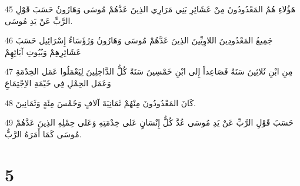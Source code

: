 \par 45 هَؤُلاءِ هُمُ المَعْدُودُونَ مِنْ عَشَائِرِ بَنِي مَرَارِي الذِينَ عَدَّهُمْ مُوسَى وَهَارُونُ حَسَبَ قَوْلِ الرَّبِّ عَنْ يَدِ مُوسَى.
\par 46 جَمِيعُ المَعْدُودِينَ اللاوِيِّينَ الذِينَ عَدَّهُمْ مُوسَى وَهَارُونُ وَرُؤَسَاءُ إِسْرَائِيل حَسَبَ عَشَائِرِهِمْ وَبُيُوتِ آبَائِهِمْ
\par 47 مِنِ ابْنِ ثَلاثِينَ سَنَةً فَصَاعِداً إِلى ابْنِ خَمْسِينَ سَنَةً كُلُّ الدَّاخِلِينَ لِيَعْمَلُوا عَمَل الخِدْمَةِ وَعَمَل الحِمْلِ فِي خَيْمَةِ الاِجْتِمَاعِ
\par 48 كَانَ المَعْدُودُونَ مِنْهُمْ ثَمَانِيَةَ آلافٍ وَخَمْسَ مِئَةٍ وَثَمَانِينَ.
\par 49 حَسَبَ قَوْلِ الرَّبِّ عَنْ يَدِ مُوسَى عُدَّ كُلُّ إِنْسَانٍ عَلى خِدْمَتِهِ وَعَلى حِمْلِهِ الذِينَ عَدَّهُمْ مُوسَى كَمَا أَمَرَهُ الرَّبُّ.

\chapter{5}

